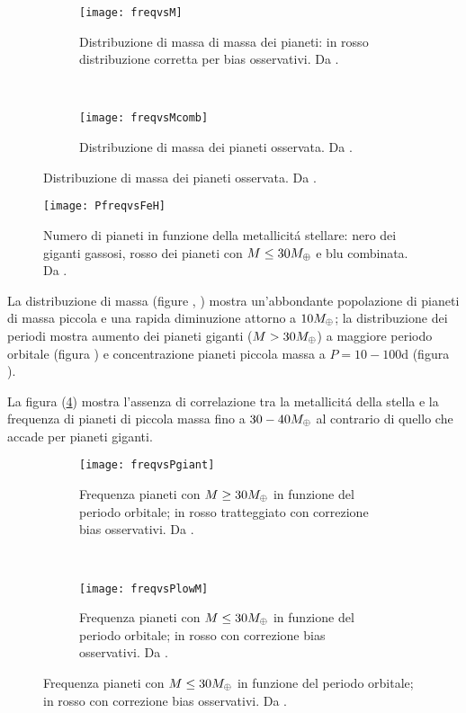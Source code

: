 \begin{figure}[!ht]
\begin{subfigure}[b]{0.49\textwidth} \centering \texttt{[image: freqvsM]}
\caption{Distribuzione di massa di massa dei pianeti: in rosso distribuzione corretta per bias osservativi. Da \cite{mayor2011harps}.}\label{fig:freqvsM}
\end{subfigure}
~
\begin{subfigure}[b]{0.49\textwidth} \centering \texttt{[image: freqvsMcomb]}
\caption{Distribuzione di massa dei pianeti osservata. Da \cite{mayor2011harps}.}\label{fig:freqvsMcomb}
\end{subfigure}
\end{figure}

\begin{figure}[!ht]
\centering \texttt{[image: PfreqvsFeH]}
\caption{Numero di pianeti in funzione della metallicit\'a stellare: nero dei giganti gassosi, rosso dei pianeti con $M\leq30M_{\oplus}{}$ e blu combinata. Da \cite{mayor2011harps}.}\label{fig:PfreqvsFeH}
\end{figure}

La distribuzione di massa (figure , ) mostra un'abbondante popolazione di pianeti di massa piccola e una rapida diminuzione attorno a $10M_{\oplus}{}$; la distribuzione dei periodi mostra aumento dei pianeti giganti ($M>30M_{\oplus}{}$) a maggiore periodo orbitale (figura ) e concentrazione pianeti piccola massa a $P=10-100\si{\day}$ (figura ).

La figura (\ref{fig:PfreqvsFeH}) mostra l'assenza di correlazione tra la metallicit\'a della stella e la frequenza di pianeti di piccola massa fino a $30-40M_{\oplus}{}$ al contrario di quello che accade per pianeti giganti.

\begin{figure}[!ht]
\begin{subfigure}[b]{0.49\textwidth} \centering \texttt{[image: freqvsPgiant]}\caption{Frequenza pianeti con $M\geq 30M_{\oplus}{}$ in funzione del periodo orbitale; in rosso  tratteggiato con correzione bias osservativi. Da \cite{mayor2011harps}.}\label{fig:freqvsPgiant} \end{subfigure}
~
\begin{subfigure}[b]{0.49\textwidth} \centering \texttt{[image: freqvsPlowM]} \caption{Frequenza pianeti con $M\leq 30M_{\oplus}{}$ in funzione del periodo orbitale; in rosso con correzione bias osservativi. Da \cite{mayor2011harps}.}\label{fig:freqvsPlowM}
\end{subfigure}
\end{figure}


